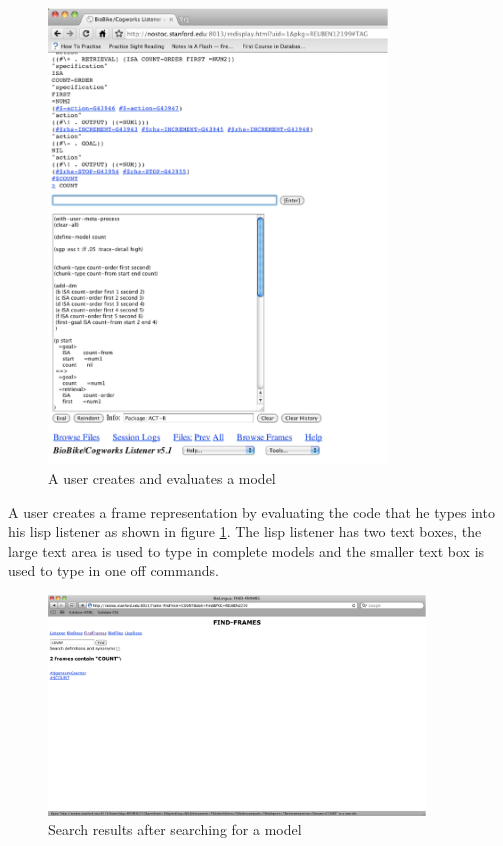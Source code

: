\begin{figure}[htp]
  \centering
  \includegraphics[width=90mm]{UserCreatesModel}
  \caption{A user creates and evaluates a model}
  \label{UserCreatesModel}
\end{figure}

A user creates a frame representation by evaluating the code that he
types into his lisp listener as shown in figure
\ref{UserCreatesModel}. The lisp listener has two text boxes, the
large text area is used to type in complete models and the smaller
text box is used to type in one off commands.

\begin{figure}[htp]
  \centering
  \includegraphics[width=100mm]{SearchForModel}
  \caption{Search results after searching for a model}
  \label{SearchForModel}
\end{figure}

